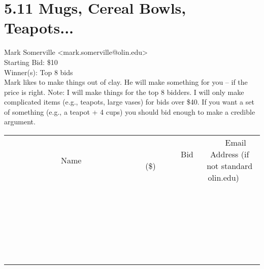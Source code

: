 \documentclass[11pt]{article}
\begin{document}
					\section*{5.11 Mugs, Cereal Bowls, Teapots...}
					Mark Somerville <mark.somerville@olin.edu> \\
					Starting Bid: \$10 \\
					Winner(s): Top 8 bids \\
					Mark likes to make things out of clay.  He will make something for you -- if the price is right.  Note: I will make things for the top 8 bidders.  I will only make complicated items (e.g., teapots, large vases) for bids over \$40.  If you want a set of something (e.g., a teapot + 4 cups) you should bid enough to make a credible argument. \\
					[6ex]
					\begin{tabular}{c c c}
						~~~~~~~~~~~~~Name~~~~~~~~~~~~~ & ~~~~~~~~~Bid (\$)~~~~~~~~~ & ~~~Email Address (if not standard olin.edu)~~~ \\
				
 & & \\
\hline
 & & \\
\hline
 & & \\
\hline
 & & \\
\hline
 & & \\
\hline
 & & \\
\hline
 & & \\
\hline
 & & \\
\hline
 & & \\
\hline
 & & \\
\hline
 & & \\
\hline
 & & \\
\hline
 & & \\
\hline
 & & \\
\hline
 & & \\
\hline
 & & \\
\hline
 & & \\
\hline
 & & \\
\hline
 & & \\
\hline
 & & \\
\hline
 & & \\
\hline
 & & \\
\hline
 & & \\
\hline
 & & \\
\hline
 & & \\
\hline
 & & \\
\hline
					\end{tabular}
					\clearpage
				
\end{document}
